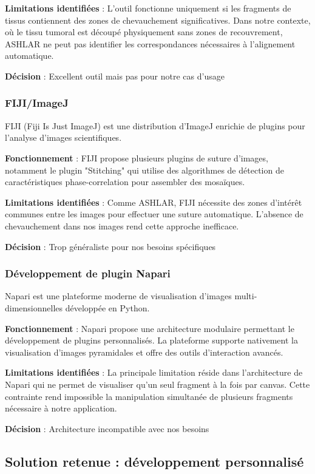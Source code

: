 \documentclass[11pt,a4paper]{report}
\begin{document}
\textbf{Limitations identifiées} : L'outil fonctionne uniquement si les fragments de tissus contiennent des zones de chevauchement significatives. Dans notre contexte, où le tissu tumoral est découpé physiquement sans zones de recouvrement, ASHLAR ne peut pas identifier les correspondances nécessaires à l'alignement automatique.

\textbf{Décision} : Excellent outil mais pas pour notre cas d'usage

\subsubsection{FIJI/ImageJ}

FIJI (Fiji Is Just ImageJ) est une distribution d'ImageJ enrichie de plugins pour l'analyse d'images scientifiques.

\textbf{Fonctionnement} : FIJI propose plusieurs plugins de suture d'images, notamment le plugin "Stitching" qui utilise des algorithmes de détection de caractéristiques phase-correlation pour assembler des mosaïques.

\textbf{Limitations identifiées} : Comme ASHLAR, FIJI nécessite des zones d'intérêt communes entre les images pour effectuer une suture automatique. L'absence de chevauchement dans nos images rend cette approche inefficace.

\textbf{Décision} : Trop généraliste pour nos besoins spécifiques

\subsubsection{Développement de plugin Napari}

Napari est une plateforme moderne de visualisation d'images multi-dimensionnelles développée en Python.

\textbf{Fonctionnement} : Napari propose une architecture modulaire permettant le développement de plugins personnalisés. La plateforme supporte nativement la visualisation d'images pyramidales et offre des outils d'interaction avancés.

\textbf{Limitations identifiées} : La principale limitation réside dans l'architecture de Napari qui ne permet de visualiser qu'un seul fragment à la fois par canvas. Cette contrainte rend impossible la manipulation simultanée de plusieurs fragments nécessaire à notre application.

\textbf{Décision} : Architecture incompatible avec nos besoins

\subsection{Solution retenue : développement personnalisé}
\end{document}
